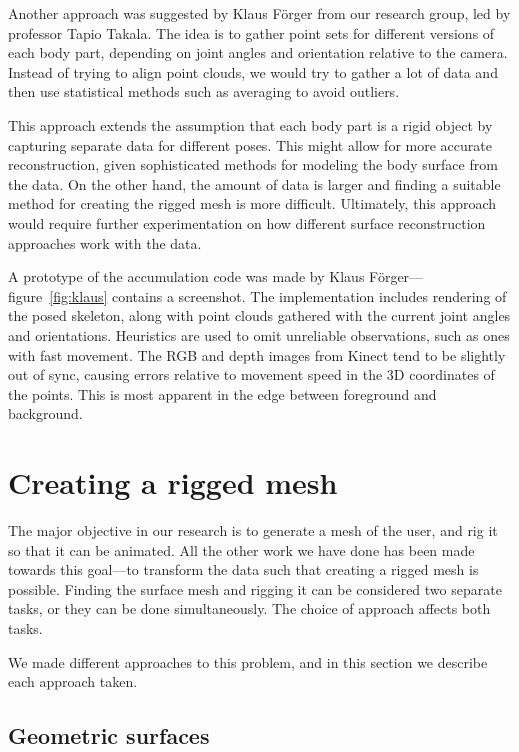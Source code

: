 Another approach was suggested by Klaus Förger from our research group, led by professor Tapio Takala. The idea is to gather point sets for different versions of each body part, depending on joint angles and orientation relative to the camera. Instead of trying to align point clouds, we would try to gather a lot of data and then use statistical methods such as averaging to avoid outliers.

This approach extends the assumption that each body part is a rigid object by capturing separate data for different poses. This might allow for more accurate reconstruction, given sophisticated methods for modeling the body surface from the data. On the other hand, the amount of data is larger and finding a suitable method for creating the rigged mesh is more difficult. Ultimately, this approach would require further experimentation on how different surface reconstruction approaches work with the data.

A prototype of the accumulation code was made by Klaus Förger---figure~\ref{fig:klaus} contains a screenshot. The implementation includes rendering of the posed skeleton, along with point clouds gathered with the current joint angles and orientations. Heuristics are used to omit unreliable observations, such as ones with fast movement. The RGB and depth images from Kinect tend to be slightly out of sync, causing errors relative to movement speed in the 3D coordinates of the points. This is most apparent in the edge between foreground and background.


\section{Creating a rigged mesh} \label{approach.mesh}

The major objective in our research is to generate a mesh of the user, and rig it so that it can be animated. All the other work we have done has been made towards this goal---to transform the data such that creating a rigged mesh is possible. Finding the surface mesh and rigging it can be considered two separate tasks, or they can be done simultaneously. The choice of approach affects both tasks.

We made different approaches to this problem, and in this section we describe each approach taken.

\subsection{Geometric surfaces} \label{approach.cylinders}

